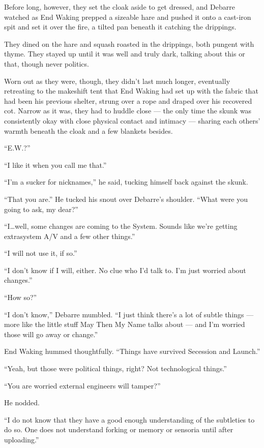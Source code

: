 Before long, however, they set the cloak aside to get dressed, and Debarre watched as End Waking prepped a sizeable hare and pushed it onto a cast-iron spit and set it over the fire, a tilted pan beneath it catching the drippings.

They dined on the hare and squash roasted in the drippings, both pungent with thyme. They stayed up until it was well and truly dark, talking about this or that, though never politics.

Worn out as they were, though, they didn't last much longer, eventually retreating to the makeshift tent that End Waking had set up with the fabric that had been his previous shelter, strung over a rope and draped over his recovered cot. Narrow as it was, they had to huddle close — the only time the skunk was consistently okay with close physical contact and intimacy — sharing each others' warmth beneath the cloak and a few blankets besides.

``E.W.?''

``I like it when you call me that.''

``I'm a sucker for nicknames,'' he said, tucking himself back against the skunk.

``That you are.'' He tucked his snout over Debarre's shoulder. ``What were you going to ask, my dear?''

``I\ldots well, some changes are coming to the System. Sounds like we're getting extrasystem A/V and a few other things.''

``I will not use it, if so.''

``I don't know if I will, either. No clue who I'd talk to. I'm just worried about changes.''

``How so?''

``I don't know,'' Debarre mumbled. ``I just think there's a lot of subtle things — more like the little stuff May Then My Name talks about — and I'm worried those will go away or change.''

End Waking hummed thoughtfully. ``Things have survived Secession and Launch.''

``Yeah, but those were political things, right? Not technological things.''

``You are worried external engineers will tamper?''

He nodded.

``I do not know that they have a good enough understanding of the subtleties to do so. One does not understand forking or memory or sensoria until after uploading.''

